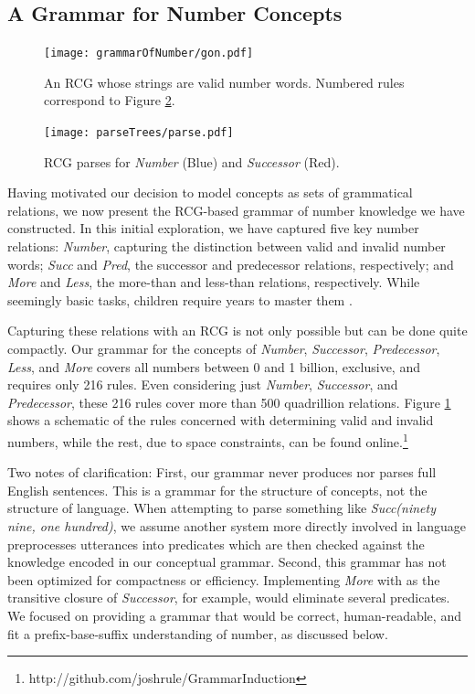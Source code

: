 \documentclass[10pt,letterpaper]{article}
\begin{document}
\subsection{A Grammar for Number Concepts}

\begin{figure}[t]
  \begin{centering}
    \texttt{[image: grammarOfNumber/gon.pdf]}
    \caption{An RCG whose strings are valid number words. Numbered rules correspond to Figure \ref{fig:parse}.}
    \label{fig:gon}
  \end{centering}
\end{figure}

\begin{figure}[t]
  \begin{centering}
    \texttt{[image: parseTrees/parse.pdf]}
    \caption{RCG parses for \emph{Number} (Blue) and \emph{Successor} (Red).}
    \label{fig:parse}
  \end{centering}
\end{figure}

Having motivated our decision to model concepts as sets of grammatical
relations, we now present the RCG-based grammar of number knowledge we
have constructed. In this initial exploration, we have captured five
key number relations: \emph{Number}, capturing the distinction between
valid and invalid number words; \emph{Succ} and \emph{Pred}, the
successor and predecessor relations, respectively; and \emph{More} and
\emph{Less}, the more-than and less-than relations, respectively.
While seemingly basic tasks, children require years to master them
\citep{FusRicBriar1982}.

Capturing these relations with an RCG is not only possible but can
be done quite compactly. Our grammar for the concepts of
\emph{Number}, \emph{Successor}, \emph{Predecessor}, \emph{Less}, and
\emph{More} covers all numbers between 0 and 1 billion, exclusive, and
requires only 216 rules. Even considering just \emph{Number},
\emph{Successor}, and \emph{Predecessor}, these 216 rules cover more
than 500 quadrillion relations. Figure \ref{fig:gon} shows a schematic
of the rules concerned with determining valid and invalid numbers,
while the rest, due to space constraints, can be found
online.\footnote{http://github.com/joshrule/GrammarInduction}

Two notes of clarification: First, our grammar never produces nor
parses full English sentences. This is a grammar for the structure of
concepts, not the structure of language. When attempting to parse
something like \emph{Succ(ninety nine, one hundred)}, we assume
another system more directly involved in language preprocesses
utterances into predicates which are then checked against the
knowledge encoded in our conceptual grammar. Second, this grammar has
not been optimized for compactness or efficiency. Implementing
\emph{More} with as the transitive closure of \emph{Successor}, for
example, would eliminate several predicates. We focused on providing a
grammar that would be correct, human-readable, and fit a
prefix-base-suffix understanding of number, as discussed below.
\end{document}

